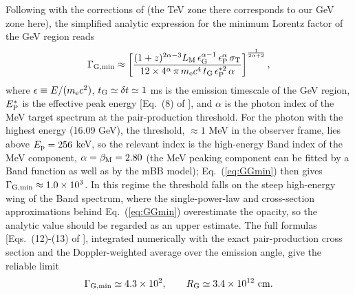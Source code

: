 \documentclass[prd,twocolumn,amsmath,amssymb,aps,linenumbers]{revtex4-2} %
\begin{document}
Following \cite{2011ApJ...726L...2Z} with the corrections of \cite{2023ApJ...956L..38G} (the TeV zone there corresponds to our GeV zone here), the simplified analytic expression for the minimum Lorentz factor of the GeV region reads
\begin{equation}\label{eq:GGmin}
\Gamma_{\rm G,min}\approx\left[\frac{(1+z)^{2\alpha-3}L_{\rm M}\,\epsilon_{\rm G}^{\alpha-1}\,\epsilon_{\rm P}^{\alpha}\,\sigma_{\rm T}}{12\times4^{\alpha}\,\pi\,m_{\rm e}c^{4}\,t_{\rm G}\,\epsilon_{\rm P}^{*2}\,\alpha}\right]^{\frac{1}{2\alpha+2}},
\end{equation}
where $\epsilon\equiv E/(m_{\rm e}c^{2})$, $t_{\rm G}\simeq\delta t\simeq1$ ms is the emission timescale of the GeV region, $E_{\rm P}^{*}$ is the effective peak energy [Eq.~(8) of \citealt{2023ApJ...956L..38G}], and $\alpha$ is the photon index of the MeV target spectrum at the pair-production threshold. For the photon with the highest energy (16.09 GeV), the threshold, $\approx1$ MeV in the observer frame, lies above $E_{\rm p}=256$ keV, so the relevant index is the high-energy Band index of the MeV component, $\alpha=\beta_{\rm M}=2.80$ (the MeV peaking component can be fitted by a Band function as well as by the mBB model); Eq.~(\ref{eq:GGmin}) then gives $\Gamma_{\rm G,min}\approx1.0\times10^{3}$. In this regime the threshold falls on the steep high-energy wing of the Band spectrum, where the single-power-law and cross-section approximations behind Eq.~(\ref{eq:GGmin}) overestimate the opacity, so the analytic value should be regarded as an upper estimate. The full formulas [Eqs.~(12)-(13) of \citealt{2023ApJ...956L..38G}], integrated numerically with the exact pair-production cross section and the Doppler-weighted average over the emission angle, give the reliable limit
\begin{equation}
\Gamma_{\rm G,min}\simeq4.3\times10^{2},\qquad R_{\rm G}\simeq3.4\times10^{12}\ {\rm cm}.
\end{equation}
\end{document}
